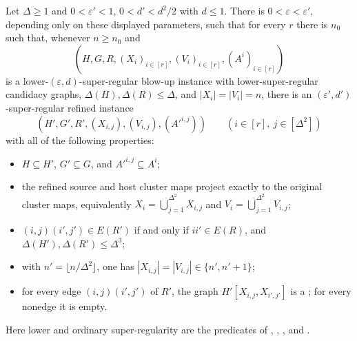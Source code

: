 \begin{lemma}
Let $\Delta\geq1$ and $0<\varepsilon'<1$, $0<d'<d^2/2$ with $d\leq1$.  There is $0<\varepsilon<\varepsilon'$, depending only on these displayed parameters, such that for every $r$ there is $n_0$ such that, whenever $n\geq n_0$ and
\[
 (H,G,R,(X_i)_{i\in[r]},(V_i)_{i\in[r]},(A^i)_{i\in[r]})
\]
is a lower-$(\varepsilon,d)$-super-regular blow-up instance with lower-super-regular candidacy graphs, $\Delta(H),\Delta(R)\leq\Delta$, and $|X_i|=|V_i|=n$, there is an $(\varepsilon',d')$-super-regular refined instance
\[
 (H',G',R',(X_{i,j}),(V_{i,j}),(A'^{i,j}))
 \qquad(i\in[r],\ j\in[\Delta^2])
\]
with all of the following properties:
\begin{itemize}
\item $H\subseteq H'$, $G'\subseteq G$, and $A'^{i,j}\subseteq A^i$;
\item the refined source and host cluster maps project exactly to the original cluster maps, equivalently $X_i=\mathbin{\dot\bigcup}_{j=1}^{\Delta^2}X_{i,j}$ and $V_i=\mathbin{\dot\bigcup}_{j=1}^{\Delta^2}V_{i,j}$;
\item $(i,j)(i',j')\in E(R')$ if and only if $ii'\in E(R)$, and $\Delta(H'),\Delta(R')\leq\Delta^3$;
\item with $n'=\lfloor n/\Delta^2\rfloor$, one has $|X_{i,j}|=|V_{i,j}|\in\{n',n'+1\}$;
\item for every edge $(i,j)(i',j')$ of $R'$, the graph $H'[X_{i,j},X_{i',j'}]$ is a ; for every nonedge it is empty.
\end{itemize}
Here lower and ordinary super-regularity are the predicates of , , , and .
\end{lemma}
